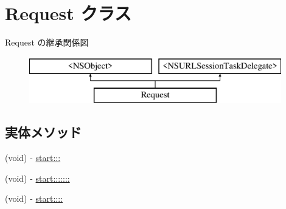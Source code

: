 \hypertarget{interface_request}{}\section{Request クラス}
\label{interface_request}
Request の継承関係図\begin{figure}[H]
\begin{center}
\leavevmode
\includegraphics[height=2.000000cm]{interface_request}
\end{center}
\end{figure}
\subsection*{実体メソッド}
\begin{DoxyCompactItemize}
\item 
(void) -\/ \hyperlink{interface_request_a27fd6c9c3df842d2e25b1eabf06f5166}{start\+:::}
\item 
(void) -\/ \hyperlink{interface_request_ac82d1d7683857bb5fcab4be1f35a624c}{start\+:::::::}
\item 
(void) -\/ \hyperlink{interface_request_a274b0ca41bd90f4d1e3f4a72796f6bff}{start\+::::}
\end{DoxyCompactItemize}
